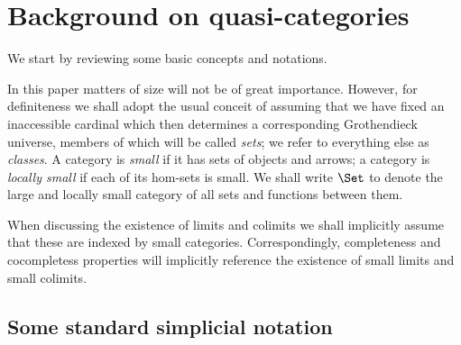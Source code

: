 


  \section{Background on quasi-categories}\label{sec:background}

	We start by reviewing some basic concepts and notations. 

  \begin{obs}[size]\label{obs:size-conventions}
    In this paper matters of size will not be of great importance. However, for definiteness we shall adopt the usual conceit of assuming that we have fixed an inaccessible cardinal which then determines a corresponding Grothendieck universe, members of which will be called {\em sets\/}; we refer to everything else as {\em classes}.  A category is {\em small\/} if it has sets of objects and arrows; a category is {\em locally small\/} if each of its hom-sets is small. We shall write $\Set$ to denote the large and locally small category of all sets and functions between them.

    When discussing the existence of limits and colimits we shall implicitly assume that these are indexed by small categories. Correspondingly, completeness and cocompletess properties will implicitly reference the existence of small limits and small colimits.
     \end{obs}

    \subsection{Some standard simplicial notation}\label{subsect:simplicial.notation}

